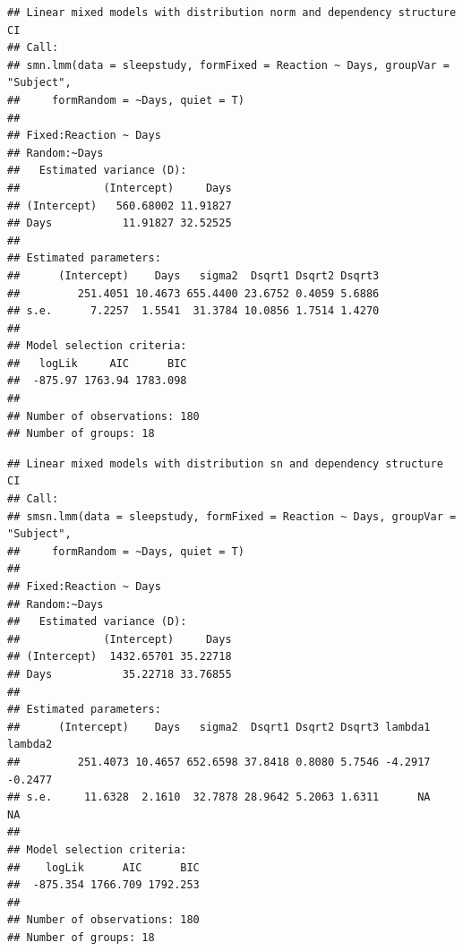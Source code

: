 \begin{frame}[fragile]
\tiny

\begin{Shaded}
\begin{Highlighting}[]
\end{Highlighting}
\end{Shaded}

\begin{verbatim}
## Linear mixed models with distribution norm and dependency structure CI 
## Call:
## smn.lmm(data = sleepstudy, formFixed = Reaction ~ Days, groupVar = "Subject", 
##     formRandom = ~Days, quiet = T)
## 
## Fixed:Reaction ~ Days
## Random:~Days
##   Estimated variance (D):
##             (Intercept)     Days
## (Intercept)   560.68002 11.91827
## Days           11.91827 32.52525
## 
## Estimated parameters:
##      (Intercept)    Days   sigma2  Dsqrt1 Dsqrt2 Dsqrt3
##         251.4051 10.4673 655.4400 23.6752 0.4059 5.6886
## s.e.      7.2257  1.5541  31.3784 10.0856 1.7514 1.4270
## 
## Model selection criteria:
##   logLik     AIC      BIC
##  -875.97 1763.94 1783.098
## 
## Number of observations: 180 
## Number of groups: 18
\end{verbatim}

\end{frame}

\begin{frame}[fragile]

\tiny

\begin{Shaded}
\begin{Highlighting}[]
\end{Highlighting}
\end{Shaded}

\begin{verbatim}
## Linear mixed models with distribution sn and dependency structure CI 
## Call:
## smsn.lmm(data = sleepstudy, formFixed = Reaction ~ Days, groupVar = "Subject", 
##     formRandom = ~Days, quiet = T)
## 
## Fixed:Reaction ~ Days
## Random:~Days
##   Estimated variance (D):
##             (Intercept)     Days
## (Intercept)  1432.65701 35.22718
## Days           35.22718 33.76855
## 
## Estimated parameters:
##      (Intercept)    Days   sigma2  Dsqrt1 Dsqrt2 Dsqrt3 lambda1 lambda2
##         251.4073 10.4657 652.6598 37.8418 0.8080 5.7546 -4.2917 -0.2477
## s.e.     11.6328  2.1610  32.7878 28.9642 5.2063 1.6311      NA      NA
## 
## Model selection criteria:
##    logLik      AIC      BIC
##  -875.354 1766.709 1792.253
## 
## Number of observations: 180 
## Number of groups: 18
\end{verbatim}

\end{frame}

